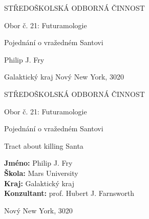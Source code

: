 \documentclass[12pt, a4paper,
    twoside,        %
    openright
]{report}
\title{\mainTitle}
\author{\authorName}
\date{\publicationYear}
\newcommand\city{Nový New York} %
\newcommand\district{Galaktický kraj} %
\newcommand\specialization{Obor č. 21: Futuramologie} %
\newcommand\school{Mars University} %
\newcommand\consultant{prof. Hubert J. Farnsworth} %
\newcommand\authorName{Philip J. Fry}  %
\newcommand\publicationYear{3020} %
\newcommand\mainTitle{Pojednání o vražedném Santovi} %
\begin{document}
\pagestyle{empty}

\begin{titlepage}
    \bfseries{ %
        \begin{center}
            \LARGE{STŘEDOŠKOLSKÁ ODBORNÁ ČINNOST}

            \vspace{14pt}
            \large{
                \specialization
            }

            \vspace{0.4 \textheight}

            \LARGE{
                \mainTitle
            }

            \vspace{0.4\textheight}
        \end{center}

        \noindent\Large{\authorName}

        \noindent\Large{\district {}  \city, \publicationYear}
    }
\end{titlepage}

\cleardoublepage

{\bfseries %
    \begin{center}
        \LARGE{STŘEDOŠKOLSKÁ ODBORNÁ ČINNOST}

        \vspace{14pt}
        \large{
            \specialization
        }

        \vspace{0.3 \textheight}

        \LARGE{
            \mainTitle
        }

        \LARGE{
            Tract about killing Santa
        }

        \vspace{0.24\textheight}
    \end{center}
}
{\Large
    \noindent\textbf{Jméno:} \authorName\\
    \textbf{Škola:} \school\\
    \textbf{Kraj:} \district\\
    \textbf{Konzultant:} \consultant\\
}

\noindent \city, \publicationYear

\cleardoublepage

\end{document}
